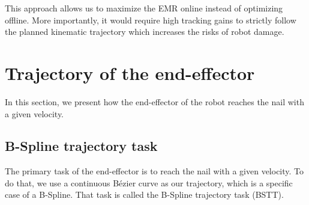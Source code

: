 \documentclass[conference]{IEEEtran}
\begin{document}
This approach allows us to maximize the EMR online instead of optimizing offline.
More importantly, it would require high tracking gains to strictly follow the planned kinematic trajectory which increases the risks of robot damage. 

\section{Trajectory of the end-effector}
\label{Trajectory of the end-effector}
\noindent
In this section, we present how the end-effector of the robot reaches the nail with a given velocity. 

\subsection{B-Spline trajectory task}
\label{BSplineTrajectoryTask}
\noindent
The primary task of the end-effector is to reach the nail with a given velocity. To do that, we use a continuous Bézier curve as our trajectory, which is a specific case of a B-Spline. That task is called the B-Spline trajectory task (BSTT).
\end{document}
